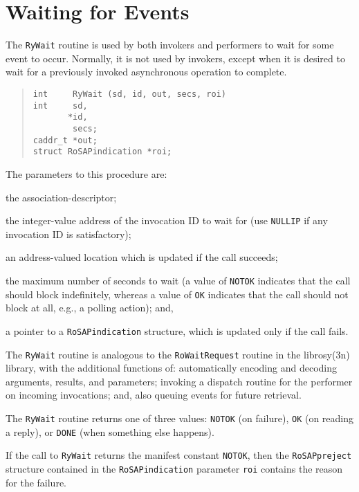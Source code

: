 \section	{Waiting for Events}\label{librosy:waiting}
The \verb"RyWait" routine is used by both invokers and performers to wait
for some event to occur.
Normally,
it is not used by invokers,
except when it is desired to wait for a previously invoked asynchronous
operation to complete.
\begin{quote}\small\begin{verbatim}
int     RyWait (sd, id, out, secs, roi)
int     sd,
       *id,
        secs;
caddr_t *out;
struct RoSAPindication *roi;
\end{verbatim}\end{quote}
The parameters to this procedure are:
\begin{describe}
\item[\verb"sd":] the association-descriptor;

\item[\verb"id":] the integer-value address of the invocation ID to wait for
(use \verb"NULLIP" if any invocation ID is satisfactory);

\item[\verb"out":] an address-valued location which is updated if the call
succeeds;

\item[\verb"secs":] the maximum number of seconds to wait
(a value of \verb"NOTOK" indicates that the call should block indefinitely,
whereas a value of \verb"OK" indicates that the call should not block at all,
e.g., a polling action);
and,

\item[\verb"roi":] a pointer to a \verb"RoSAPindication" structure,
which is updated only if the call fails.
\end{describe}
The \verb"RyWait" routine is analogous to the \verb"RoWaitRequest" routine in
the \man librosy(3n) library,
with the additional functions of:
automatically encoding and decoding arguments, results, and parameters;
invoking a dispatch routine for the performer on incoming invocations;
and,
also queuing events for future retrieval.

The \verb"RyWait" routine returns one of three values:
\verb"NOTOK" (on failure),
\verb"OK" (on reading a reply),
or
\verb"DONE" (when something else happens).

If the call to \verb"RyWait" returns the manifest constant \verb"NOTOK",
then the \verb"RoSAPpreject" structure contained in
the \verb"RoSAPindication" parameter
\verb"roi" contains the reason for the failure.

